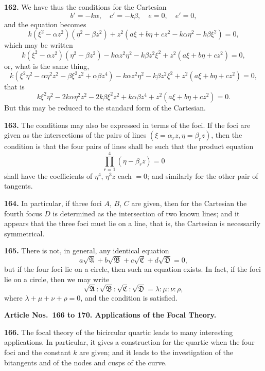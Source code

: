 \documentclass[12pt,a4paper]{article}
\theoremstyle{definition}
\begin{document}
\newpage
\noindent\textbf{162.} We have thus the conditions for the Cartesian
\[
b' = -k\alpha, \quad c' = -k\beta, \quad e = 0, \quad e' = 0,
\]
and the equation becomes
\[
k(\xi^2 - \alpha z^2)(\eta^2 - \beta z^2) + z^2(a\xi + b\eta + cz^2 - k\alpha\eta^2 - k\beta\xi^2) = 0,
\]
which may be written
\[
k(\xi^2 - \alpha z^2)(\eta^2 - \beta z^2) - k\alpha z^2\eta^2 - k\beta z^2\xi^2 + z^2(a\xi + b\eta + cz^2) = 0,
\]
or, what is the same thing,
\[
k(\xi^2\eta^2 - \alpha\eta^2z^2 - \beta\xi^2z^2 + \alpha\beta z^4) - k\alpha z^2\eta^2 - k\beta z^2\xi^2 + z^2(a\xi + b\eta + cz^2) = 0,
\]
that is
\[
k\xi^2\eta^2 - 2k\alpha\eta^2z^2 - 2k\beta\xi^2z^2 + k\alpha\beta z^4 + z^2(a\xi + b\eta + cz^2) = 0.
\]
But this may be reduced to the standard form of the Cartesian.

\noindent\textbf{163.} The conditions may also be expressed in terms of the foci. If the foci
are given as the intersections of the pairs of lines $(\xi = \alpha_r z, \eta = \beta_r z)$, then the
condition is that the four pairs of lines shall be such that the product equation
\[
\prod_{r=1}^{4}(\eta - \beta_r z) = 0
\]
shall have the coefficients of $\eta^4$, $\eta^3z$ each $= 0$; and similarly for the other pair of tangents.

\noindent\textbf{164.} In particular, if three foci $A$, $B$, $C$ are given, then for the Cartesian the
fourth focus $D$ is determined as the intersection of two known lines; and it appears
that the three foci must lie on a line, that is, the Cartesian is necessarily symmetrical.

\newpage
\noindent\textbf{165.} There is not, in general, any identical equation
\[
a\sqrt{\mathfrak{A}} + b\sqrt{\mathfrak{B}} + c\sqrt{\mathfrak{C}} + d\sqrt{\mathfrak{D}} = 0,
\]
but if the four foci lie on a circle, then such an equation exists. In fact, if the foci
lie on a circle, then we may write
\[
\sqrt{\mathfrak{A}} : \sqrt{\mathfrak{B}} : \sqrt{\mathfrak{C}} : \sqrt{\mathfrak{D}} = \lambda : \mu : \nu : \rho,
\]
where $\lambda + \mu + \nu + \rho = 0$, and the condition is satisfied.

\vspace{0.5em}
\noindent\textbf{Article Nos.~166 to 170. Applications of the Focal Theory.}

\vspace{0.3em}
\noindent\textbf{166.} The focal theory of the bicircular quartic leads to many interesting applications. In particular, it gives a construction for the quartic when the four foci and
the constant $k$ are given; and it leads to the investigation of the bitangents and of
the nodes and cusps of the curve.
\end{document}
